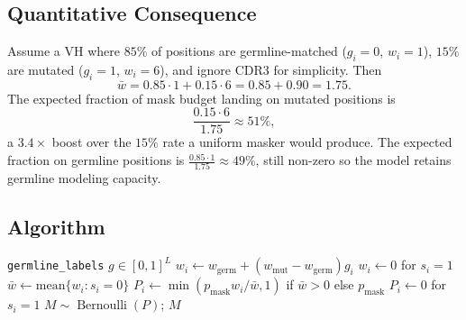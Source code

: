 \documentclass[11pt]{article}
\newcommand{\pmask}{p_{\text{mask}}}
\DeclareMathOperator{\Bern}{Bernoulli}
\begin{document}
\subsection{Quantitative Consequence}
Assume a VH where $85\%$ of positions are germline-matched
($g_i = 0$, $w_i = 1$), $15\%$ are mutated ($g_i = 1$, $w_i = 6$),
and ignore CDR3 for simplicity. Then
\begin{equation}
\bar w = 0.85 \cdot 1 + 0.15 \cdot 6 = 0.85 + 0.90 = 1.75.
\end{equation}
The expected fraction of mask budget landing on mutated positions is
\begin{equation}
\frac{0.15 \cdot 6}{1.75} \approx 51\%,
\end{equation}
a $3.4\times$ boost over the $15\%$ rate a uniform masker would
produce. The expected fraction on germline positions is
$\frac{0.85 \cdot 1}{1.75} \approx 49\%$, still non-zero so the model
retains germline modeling capacity.

\subsection{Algorithm}
\begin{algorithm}[H]
\caption{Germline Masking}
\begin{algorithmic}[1]
\Require \texttt{germline\_labels} $g \in [0,1]^L$
 \Return {} \EndIf
\State $w_i \gets w_{\text{germ}} + (w_{\text{mut}} - w_{\text{germ}}) g_i$
\State $w_i \gets 0$ for $s_i = 1$
\State $\bar w \gets \text{mean}\{w_i : s_i = 0\}$
\State $P_i \gets \min(\pmask w_i / \bar w, 1)$ if $\bar w > 0$ else $\pmask$
\State $P_i \gets 0$ for $s_i = 1$
\State $M \sim \Bern(P)$; \Return $M$
\end{algorithmic}
\end{algorithm}
\end{document}
